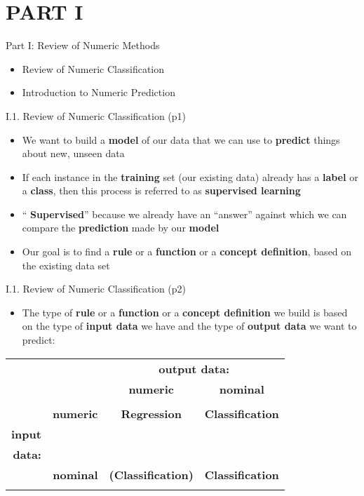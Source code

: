 \documentclass[handout]{beamer}
\newcommand{\strong}[1]{\textbf{\color{teal} #1}}
\newcommand{\stronger}[1]{\textbf{\color{purple} #1}}
\begin{document}
\section{PART I}
\begin{frame}{Part I: Review of Numeric Methods}
\begin{itemize}
\item[I.1] Review of Numeric Classification
\item[I.2] Introduction to Numeric Prediction
\end{itemize}
\end{frame}
\begin{frame}{I.1. Review of Numeric Classification (p1)}
\begin{itemize}
\item We want to build a \strong{model} of our data that we can use to \strong{predict} things about new, unseen data
\item If each instance in the \strong{training} set (our existing data) already has a \strong{label} or a \strong{class}, then this process is referred to as \stronger{supervised learning}
\item ``\stronger{Supervised}'' because we already have an ``answer'' against which we can compare the \strong{prediction} made by our \strong{model}
\item Our goal is to find a \stronger{rule} or a \stronger{function} or a \stronger{concept definition}, based on the existing data set
\end{itemize}
\end{frame}
\begin{frame}{I.1. Review of Numeric Classification (p2)}
\begin{itemize}
\item The type of \stronger{rule} or a \stronger{function} or a \stronger{concept definition} we build is based on the type of \textbf{input data} we have and the type of \textbf{output data} we want to predict:
\end{itemize}
\begin{center}
\begin{tabular}{rr||c|c|}
  &    & \multicolumn{2}{|c|}{\textbf{output data:}} \\
  &    & \strong{numeric} & \strong{nominal} \\
\hline
\hline
& & & \\
& \strong{numeric} & \stronger{Regression}  & \stronger{Classification} \\
\textbf{input} & & & \\
\cline{2-4}
\textbf{data:} & & & \\
              & \strong{nominal} & \stronger{(Classification)} & \stronger{Classification} \\
& & & \\
\hline
\end{tabular}
\end{center}
\end{frame}
\end{document}
